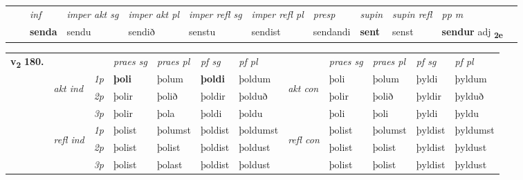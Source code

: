 \begin{tabular}{llllllllllll}
 & & \textit{inf} & \textit{imper akt sg} & \textit{imper akt pl} & \textit{imper refl sg} & \textit{imper refl pl} & \textit{presp} & \textit{supin} & \textit{supin refl} & \textit{pp m}     \\*
  & & \textbf{senda} & sendu  & sendið & senstu & sendist & sendandi &  \textbf{sent} & senst & \textbf{sendur} adj \textbf{\textsubscript{2e}} \\*
\cmidrule{1-12}
\end{tabular}



\begin{tabular}{llllllllllll} \toprule
\multirow{4}{*}{{{\textbf{v{\textsubscript{2}}} \Large{\textbf{180.}}}}}  & &   &  \textit{praes sg}  & \textit{praes pl}  &\textit{ pf sg} & \textit{pf pl} &  &  \textit{praes sg}  & \textit{praes pl}  & \textit{pf sg} & \textit{pf pl } \\*
	\cmidrule{4-7} \cmidrule{9-12}
 & \multirow{3}{*}{\begin{turn}{90}\textit{akt ind}\end{turn}} & {\textit{1p}} & \textbf{þoli} & þolum    & \textbf{þoldi} & þoldum & \multirow{3}{*}{\begin{turn}{90}\textit{akt con}\end{turn}} &þoli & þolum & þyldi & þyldum\\*
& &  {\textit{2p}} &  þolir  & þolið   & þoldir & þolduð & & þolir & þolið & þyldir & þylduð \\*
& &  {\textit{3p}} & þolir & þola   & þoldi & þoldu & & þoli & þoli& þyldi & þyldu  \\*
\cmidrule{4-7} \cmidrule{9-12}
 &\multirow{3}{*}{\begin{turn}{90}\textit{refl ind}\end{turn}} & {\textit{1p}} & þolist & þolumst    & þoldist & þoldumst & \multirow{3}{*}{\begin{turn}{90}\textit{refl con}\end{turn}}  &þolist & þolumst & þyldist & þyldumst\\*
 &&  {\textit{2p}} &  þolist  & þolist   & þoldist & þoldust & &þolist & þolist & þyldist & þyldust \\*
& &  {\textit{3p}} & þolist & þolast   & þoldist & þoldust & & þolist & þolist& þyldist & þyldust  \\*
\cmidrule{4-7} \cmidrule{9-12}
\end{tabular}


